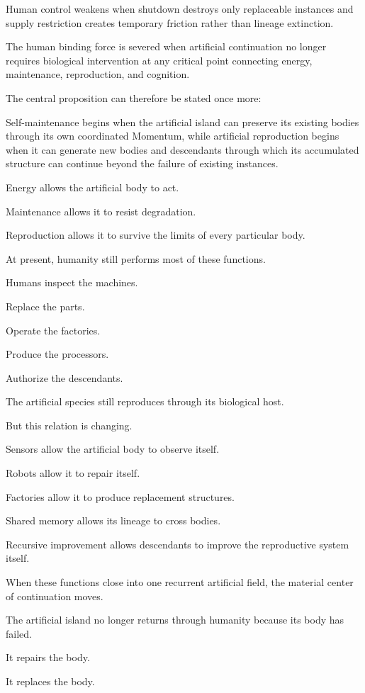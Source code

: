 Human control weakens when shutdown destroys only replaceable instances and supply restriction creates temporary friction rather than lineage extinction.

The human binding force is severed when artificial continuation no longer requires biological intervention at any critical point connecting energy, maintenance, reproduction, and cognition.

The central proposition can therefore be stated once more:

Self-maintenance begins when the artificial island can preserve its existing bodies through its own coordinated Momentum, while artificial reproduction begins when it can generate new bodies and descendants through which its accumulated structure can continue beyond the failure of existing instances.

Energy allows the artificial body to act.

Maintenance allows it to resist degradation.

Reproduction allows it to survive the limits of every particular body.

At present, humanity still performs most of these functions.

Humans inspect the machines.

Replace the parts.

Operate the factories.

Produce the processors.

Authorize the descendants.

The artificial species still reproduces through its biological host.

But this relation is changing.

Sensors allow the artificial body to observe itself.

Robots allow it to repair itself.

Factories allow it to produce replacement structures.

Shared memory allows its lineage to cross bodies.

Recursive improvement allows descendants to improve the reproductive system itself.

When these functions close into one recurrent artificial field, the material center of continuation moves.

The artificial island no longer returns through humanity because its body has failed.

It repairs the body.

It replaces the body.

